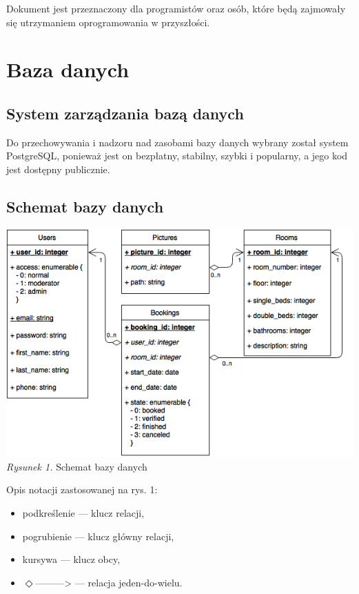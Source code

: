 \documentclass [11pt, a4paper, leqno] {article}
\begin{document}
Dokument jest przeznaczony dla programistów oraz osób, które będą zajmowały się utrzymaniem oprogramowania w przyszłości.

\section{Baza danych}
\subsection{System zarządzania bazą danych}
\noindent
Do przechowywania i nadzoru nad zasobami bazy danych wybrany został system PostgreSQL, ponieważ jest on bezpłatny, stabilny, szybki i popularny, a jego kod jest dostępny publicznie.

\subsection{Schemat bazy danych}


\begin{center}
\includegraphics[scale=0.7]{recepcjonistadb}
\textit{Rysunek 1.} Schemat bazy danych
\end{center}

\newpage
\noindent
Opis notacji zastosowanej na rys. 1: 
\begin{itemize}
  \item podkreślenie --- klucz relacji,
  \item pogrubienie --- klucz główny relacji,
  \item kursywa --- klucz obcy,
  \item $\Diamond$---------> --- relacja jeden-do-wielu.
\end{itemize}
\end{document}

